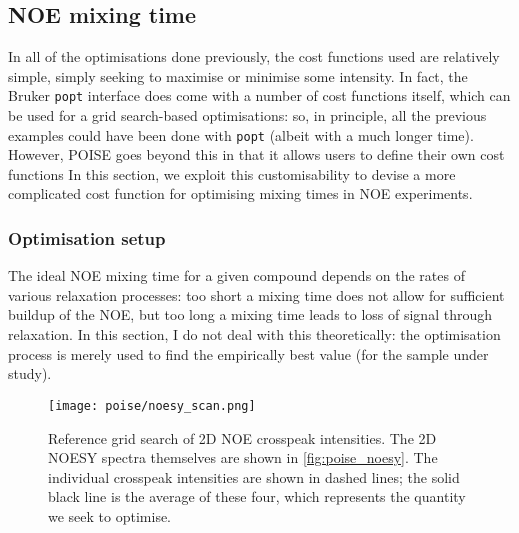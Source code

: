 \subsection{NOE mixing time}
\label{subsec:poise__noe}

In all of the optimisations done previously, the cost functions used are relatively simple, simply seeking to maximise or minimise some intensity.
In fact, the Bruker \texttt{popt} interface does come with a number of cost functions itself, which can be used for a grid search-based optimisations: so, in principle, all the previous examples could have been done with \texttt{popt} (albeit with a much longer time).
However, POISE goes beyond this in that it allows users to define their own cost functions
In this section, we exploit this customisability to devise a more complicated cost function for optimising mixing times in NOE experiments.

\subsubsection{Optimisation setup}

The ideal NOE mixing time for a given compound depends on the rates of various relaxation processes: too short a mixing time does not allow for sufficient buildup of the NOE, but too long a mixing time leads to loss of signal through relaxation.
In this section, I do not deal with this theoretically: the optimisation process is merely used to find the empirically best value (for the sample under study).

\begin{figure}[htb]
    \centering
    \texttt{[image: poise/noesy\_scan.png]}%
    \caption[Reference grid search of 2D NOE crosspeak intensities]{
        Reference grid search of 2D NOE crosspeak intensities.
        The 2D NOESY spectra themselves are shown in \cref{fig:poise_noesy}.
        The individual crosspeak intensities are shown in dashed lines; the solid black line is the average of these four, which represents the quantity we seek to optimise.
    }
    \label{fig:poise_noesy_scan}
\end{figure}

